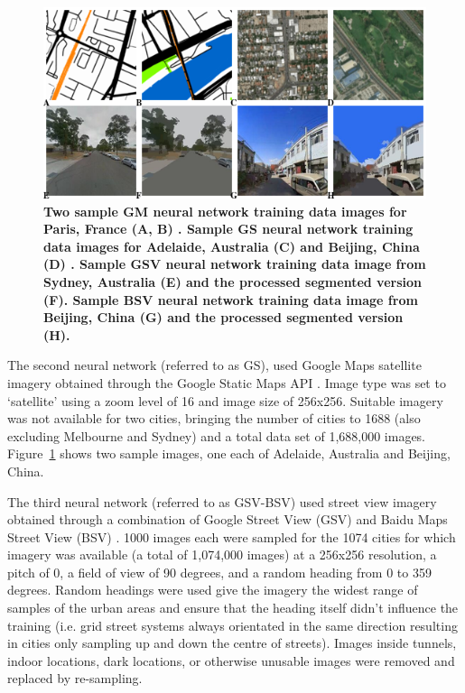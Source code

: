 \documentclass[Crown,sageh,times]{sagej}
\begin{document}
\begin{figure}[!htbp]
    \centering    
\includegraphics[scale=0.5]{Images/Figure2Maps_2.png}  
\caption{\bf Two sample GM neural network training data images for Paris, France (A, B) \citep{GoogleStatic2017}. Sample GS neural network training data images for Adelaide, Australia (C) and Beijing, China (D) \citep{GoogleStatic2017}. Sample GSV neural network training data image from Sydney, Australia (E) \citep{GoogleMaps2017b} and the processed segmented version (F). Sample BSV neural network training data image from Beijing, China (G) \citep{Baidu2017} and the processed segmented version (H).}    
 \label{fig:maps}  
\end{figure} 




The second neural network (referred to as GS), used Google Maps satellite imagery obtained through the Google Static Maps API \citep{GoogleStatic2017}. Image type was set to `satellite' using a zoom level of 16 and image size of 256x256. Suitable imagery was not available for two cities, bringing the number of cities to 1688 (also excluding Melbourne and Sydney) and a total data set of 1,688,000 images. Figure~\ref{fig:maps} shows two sample images, one each of Adelaide, Australia and Beijing, China. 






The third neural network (referred to as GSV-BSV) used street view imagery obtained through a combination of Google Street View (GSV) \citep{GoogleMaps2017b} and Baidu Maps Street View (BSV) \citep{Baidu2017}. 1000 images each were sampled for the 1074 cities for which imagery was available (a total of 1,074,000 images) at a 256x256 resolution, a pitch of 0, a field of view of 90 degrees, and a random heading from 0 to 359 degrees. Random headings were used give the imagery the widest range of samples of the urban areas and ensure that the heading itself didn't influence the training (i.e. grid street systems always orientated in the same direction resulting in cities only sampling up and down the centre of streets). Images inside tunnels, indoor locations, dark locations, or otherwise unusable images were removed and replaced by re-sampling.
\end{document}
